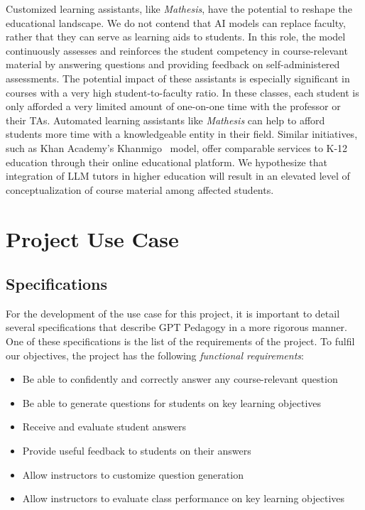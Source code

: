 \documentclass[12pt,a4paper]{article}
\begin{document}
    Customized learning assistants, like \textit{Mathesis}, have the potential to reshape the educational
    landscape. We do not contend that AI models can replace faculty, rather that they can serve as
    learning aids to students. In this role, the model continuously assesses and reinforces the
    student competency in course-relevant material by answering questions and providing feedback on
    self-administered assessments.  The potential impact of these assistants is especially significant
    in courses with a very high student-to-faculty ratio.  In these classes, each student is only
    afforded a very limited amount of one-on-one time with the professor or their TAs.  Automated
    learning assistants like \textit{Mathesis} can help to afford students more time with a
    knowledgeable entity in their field.  Similar initiatives, such as Khan Academy's Khanmigo~\cite{khanmigo}
    model, offer comparable services to K-12 education through their online educational platform.
    We hypothesize that integration of LLM tutors in higher education will result in an elevated
    level of conceptualization of course material among affected students.

    \section{Project Use Case}

    \subsection{Specifications}

    For the development of the use case for this project, it is important to detail several
    specifications that describe GPT Pedagogy in a more rigorous manner.  One of these specifications
    is the list of the requirements of the project.  To fulfil our objectives, the
    project has the following \textit{functional requirements}:

    \begin{itemize}
        \label{functionalReqs}

        \item Be able to confidently and correctly answer any course-relevant question
        \item Be able to generate questions for students on key learning objectives
        \item Receive and evaluate student answers
        \item Provide useful feedback to students on their answers
        \item Allow instructors to customize question generation
        \item Allow instructors to evaluate class performance on key learning objectives
    \end{itemize}
\end{document}
